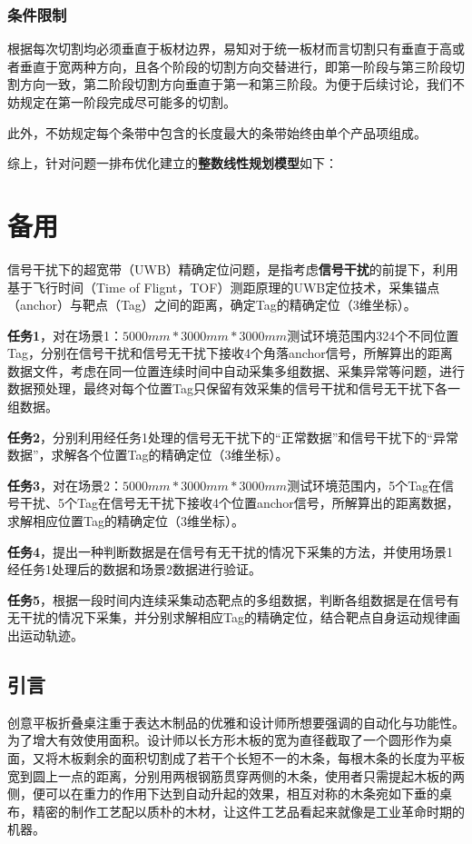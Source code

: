 \documentclass[bwprint]{gmcmthesis}
\begin{document}
\subsubsection{条件限制}


根据每次切割均必须垂直于板材边界，易知对于统一板材而言切割只有垂直于高或者垂直于宽两种方向，且各个阶段的切割方向交替进行，即第一阶段与第三阶段切割方向一致，第二阶段切割方向垂直于第一和第三阶段。为便于后续讨论，我们不妨规定在第一阶段完成尽可能多的切割。







此外，不妨规定每个条带中包含的长度最大的条带始终由单个产品项组成。



综上，针对问题一排布优化建立的\textbf{整数线性规划模型}如下：



\section{备用}
信号干扰下的超宽带（UWB）精确定位问题，是指考虑\textbf{信号干扰}的前提下，利用基于飞行时间（Time of Flignt，TOF）测距原理的UWB定位技术，采集锚点（anchor）与靶点（Tag）之间的距离，确定Tag的精确定位（3维坐标）。

\textbf{任务1}，对在场景1：$5000mm*3000mm*3000mm$测试环境范围内324个不同位置Tag，分别在信号干扰和信号无干扰下接收4个角落anchor信号，所解算出的距离数据文件，考虑在同一位置连续时间中自动采集多组数据、采集异常等问题，进行数据预处理，最终对每个位置Tag只保留有效采集的信号干扰和信号无干扰下各一组数据。

\textbf{任务2}，分别利用经任务1处理的信号无干扰下的“正常数据”和信号干扰下的“异常数据”，求解各个位置Tag的精确定位（3维坐标）。

\textbf{任务3}，对在场景2：$5000mm*3000mm*3000mm$测试环境范围内，5个Tag在信号干扰、5个Tag在信号无干扰下接收4个位置anchor信号，所解算出的距离数据，求解相应位置Tag的精确定位（3维坐标）。

\textbf{任务4}，提出一种判断数据是在信号有无干扰的情况下采集的方法，并使用场景1经任务1处理后的数据和场景2数据进行验证。

\textbf{任务5}，根据一段时间内连续采集动态靶点的多组数据，判断各组数据是在信号有无干扰的情况下采集，并分别求解相应Tag的精确定位，结合靶点自身运动规律画出运动轨迹。

\subsection{引言}
创意平板折叠桌注重于表达木制品的优雅和设计师所想要强调的自动化与功能性。为了增大有效使用面积。设计师以长方形木板的宽为直径截取了一个圆形作为桌面，又将木板剩余的面积切割成了若干个长短不一的木条，每根木条的长度为平板宽到圆上一点的距离，分别用两根钢筋贯穿两侧的木条，使用者只需提起木板的两侧，便可以在重力的作用下达到自动升起的效果，相互对称的木条宛如下垂的桌布，精密的制作工艺配以质朴的木材，让这件工艺品看起来就像是工业革命时期的机器。
\end{document}
